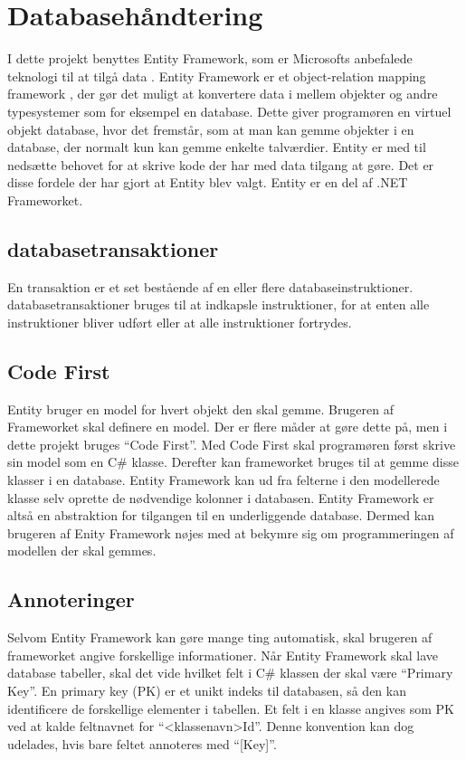 \section{Databasehåndtering}
\label{sec:database}
I dette projekt benyttes Entity Framework, som er Microsofts anbefalede teknologi til at tilgå data \cite{entity}. Entity Framework er et object-relation mapping framework \cite{lerman2010programming}, der gør det muligt at konvertere data i mellem objekter og andre typesystemer som for eksempel en database. Dette giver programøren en virtuel objekt database, hvor det fremstår, som at man kan gemme objekter i en database, der normalt kun kan gemme enkelte talværdier. Entity er med til nedsætte behovet for at skrive kode der har med data tilgang at gøre. Det er disse fordele der har gjort at Entity blev valgt. Entity er en del af .NET Frameworket.



\subsection{databasetransaktioner}
\label{sub:databasetransaktioner}
En transaktion er et set bestående af en eller flere databaseinstruktioner. databasetransaktioner bruges til at indkapsle instruktioner, for at enten alle instruktioner bliver udført eller at alle instruktioner fortrydes. 




\subsection{Code First}
\label{sub:code_first}
Entity bruger en model for hvert objekt den skal gemme. Brugeren af Frameworket skal definere en model. Der er flere måder at gøre dette på, men i dette projekt bruges \enquote{Code First}. Med Code First skal programøren først skrive sin model som en C\# klasse. Derefter kan frameworket bruges til at gemme disse klasser i en database. Entity Framework kan ud fra felterne i den modellerede klasse selv oprette de nødvendige kolonner i databasen. Entity Framework er altså en abstraktion for tilgangen til en underliggende database. Dermed kan brugeren af Enity Framework nøjes med at bekymre sig om programmeringen af modellen der skal gemmes.

\subsection{Annoteringer}
\label{sub:annoteringer}
Selvom Entity Framework kan gøre mange ting automatisk, skal brugeren af frameworket angive forskellige informationer. Når Entity Framework skal lave database tabeller, skal det vide hvilket felt i C\# klassen der skal være \enquote{Primary Key}. En primary key (PK) er et unikt indeks til databasen, så den kan identificere de forskellige elementer i tabellen. Et felt i en klasse angives som PK ved at kalde feltnavnet for \enquote{<klassenavn>Id}. Denne konvention kan dog udelades, hvis bare feltet annoteres med \enquote{[Key]}.

